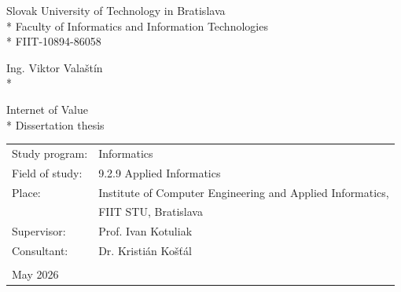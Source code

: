 \begin{center}
\large{
Slovak University of Technology in Bratislava
\\*
Faculty of Informatics and Information Technologies
\\*
\medskip{}
FIIT-10894-86058
}
\end{center}

\vspace*{\fill}

\begin{center}
\large{
Ing. Viktor Valaštín
\medskip{}
\\*

Internet of Value
\medskip{}
\\*
Dissertation thesis
}
\end{center}

\vspace*{\fill}

\noindent
\begin{tabular}{@{}l l}
    Study program: & Informatics \\
    Field of study: & 9.2.9 Applied Informatics \\
    Place:  & Institute of Computer Engineering and Applied Informatics,\\
            & FIIT STU, Bratislava \\
    Supervisor: & Prof. Ivan Kotuliak \\
    Consultant: & Dr. Kristián Košťál \\
    & \\
    May 2026
\end{tabular}

\cleardoublepage
